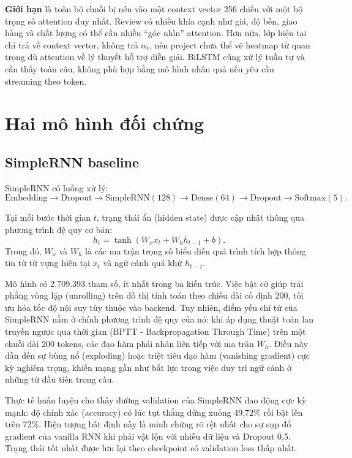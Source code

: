 \documentclass[12pt]{report}
\newcommand{\codeword}[1]{\texttt{\detokenize{#1}}}
\begin{document}
\textbf{Giới hạn} là toàn bộ chuỗi bị nén vào một context vector 256 chiều với
một bộ trọng số attention duy nhất. Review có nhiều khía cạnh như giá, độ bền,
giao hàng và chất lượng có thể cần nhiều ``góc nhìn'' attention. Hơn nữa, lớp
hiện tại chỉ trả về context vector, không trả $\alpha_t$, nên project chưa thể
vẽ heatmap từ quan trọng dù attention về lý thuyết hỗ trợ diễn giải. BiLSTM cũng
xử lý tuần tự và cần thấy toàn câu, không phù hợp bằng mô hình nhân quả nếu yêu
cầu streaming theo token.



\chapter{Hai mô hình đối chứng}

\section{SimpleRNN baseline}

SimpleRNN có luồng xử lý:
\[
\text{Embedding}
\rightarrow \text{Dropout}
\rightarrow \text{SimpleRNN}(128)
\rightarrow \text{Dense}(64)
\rightarrow \text{Dropout}
\rightarrow \text{Softmax}(5).
\]

Tại mỗi bước thời gian $t$, trạng thái ẩn (hidden state) được cập nhật thông qua phương trình đệ quy cơ bản:
\begin{equation}
h_t=\tanh(W_x x_t + W_h h_{t-1} + b).
\end{equation}
Trong đó, $W_x$ và $W_h$ là các ma trận trọng số biểu diễn quá trình tích hợp thông tin từ từ vựng hiện tại $x_t$ và ngữ cảnh quá khứ $h_{t-1}$.

Mô hình có 2.709.393 tham số, ít nhất trong ba kiến trúc. Việc bật cờ \codeword{unroll=True} giúp trải phẳng vòng lặp (unrolling) trên đồ thị tính toán theo chiều dài cố định 200, tối ưu hóa tốc độ nội suy tùy thuộc vào backend. Tuy nhiên, điểm yếu chí tử của SimpleRNN nằm ở chính phương trình đệ quy của nó: khi áp dụng thuật toán lan truyền ngược qua thời gian (BPTT - Backpropagation Through Time) trên một chuỗi dài 200 tokens, các đạo hàm phải nhân liên tiếp với ma trận $W_h$. Điều này dẫn đến sự bùng nổ (exploding) hoặc triệt tiêu đạo hàm (vanishing gradient) cực kỳ nghiêm trọng, khiến mạng gần như bất lực trong việc duy trì ngữ cảnh ở những từ đầu tiên trong câu.

Thực tế huấn luyện cho thấy đường validation của SimpleRNN dao động cực kỳ mạnh: độ chính xác (accuracy) có lúc tụt thẳng đứng xuống 49,72\% rồi bật lên trên 72\%. Hiện tượng bất định này là minh chứng rõ rệt nhất cho sự sụp đổ gradient của vanilla RNN khi phải vật lộn với nhiễu dữ liệu và Dropout 0,5. Trạng thái tốt nhất được lưu lại theo checkpoint có validation loss thấp nhất.
\end{document}
